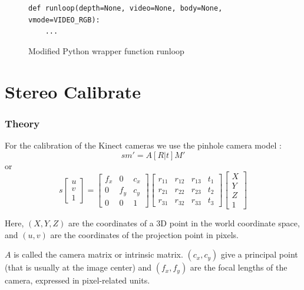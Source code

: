 \begin{figure}[H]
\begin{lstlisting}
def runloop(depth=None, video=None, body=None, vmode=VIDEO_RGB):
    ...
\end{lstlisting}
\caption{Modified Python wrapper function runloop}
\label{code:mod_runloop}
\end{figure}


\section{Stereo Calibrate}
\label{sec:stereo_calibrate}

\subsubsection{Theory}
For the calibration of the Kinect cameras we use the pinhole camera model \cite{OPENCV}:
\[
s m' = A \left[R|t\right]M'
\]
or
\[
s 
\left[ \begin{array}{c} 
u\\
v\\
1  
\end{array} \right]
=
\left[ \begin{array}{ccc} 
f_x & 0 & c_x\\
0 & f_y & c_y\\
0 & 0 & 1  
\end{array} \right]
\left[ \begin{array}{cccc}
r_{11} & r_{12} & r_{13} & t_1\\
r_{21} & r_{22} & r_{23} & t_2\\
r_{31} & r_{32} & r_{33} & t_3
\end{array} \right]
\left[ \begin{array}{c} 
X\\
Y\\
Z\\
1  
\end{array} \right]
\]

Here, $\left( X, Y, Z \right)$ are the coordinates of a 3D point in the world
coordinate space, and $\left( u, v \right)$ are the coordinates of the
projection point in pixels.

$A$ is called the camera matrix or intrinsic matrix. $\left( c_x, c_y \right)$
give a principal point (that is usually at the image center) and $\left( f_x,
f_y \right)$ are the focal lengths of the camera, expressed in pixel-related
units.

